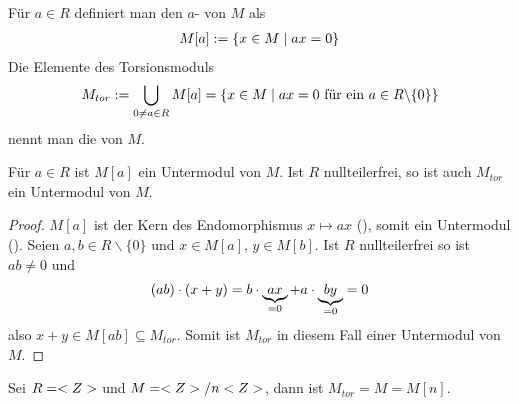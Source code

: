 \begin{definition}[Torsionsmodul]
	Für $a\in R$ definiert man den $a$- von $M$ als
	\begin{align}
		M[a]:=\{x\in M\mid ax=0\}\notag
	\end{align}
	Die Elemente des Torsionsmoduls
	\begin{align}
		M_{tor}:=\bigcup_{0\neq a\in R} M[a]=\{x\in M\mid ax=0\text{ für ein } a\in R\backslash\{0\}\}\notag
	\end{align}
	nennt man die  von $M$.
\end{definition}

\begin{proposition}
	Für $a\in R$ ist $M[a]$ ein Untermodul von $M$. Ist $R$ nullteilerfrei, so ist auch $M_{tor}$ ein Untermodul von $M$.
\end{proposition}
\begin{proof}
	$M[a]$ ist der Kern des Endomorphismus $x\mapsto ax$ (), somit ein Untermodul ().  Seien $a,b\in R\backslash\{0\}$ und $x\in M[a]$, $y\in M[b]$. Ist $R$ nullteilerfrei so ist $ab\neq 0$ und 
	\begin{align}
		(ab)\cdot (x+y)=b\cdot \underbrace{ax}_{=0} + a\cdot \underbrace{by}_{=0}=0\notag
	\end{align}
	also $x+y\in M[ab]\subseteq M_{tor}$. Somit ist $M_{tor}$ in diesem Fall einer Untermodul von $M$.
\end{proof}

\begin{example}
	Sei $R=<Z>$ und $M=<Z>/n<Z>$, dann ist $M_{tor}=M=M[n]$.
\end{example}